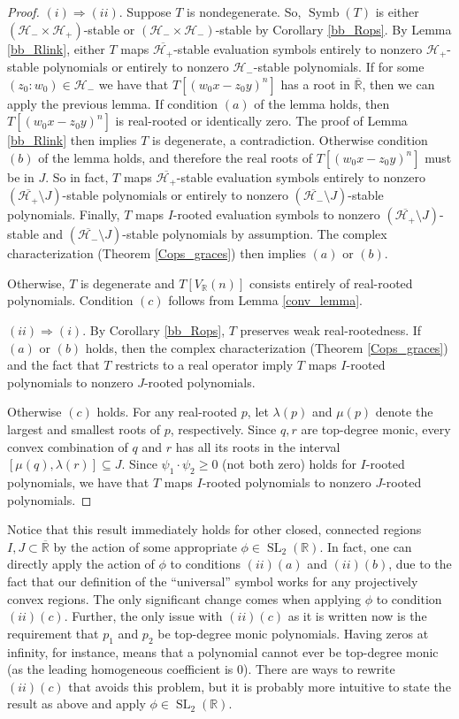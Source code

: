 \documentclass{article}
\theoremstyle{definition}
\theoremstyle{plain}
\newcommand{\R}{\mathbb{R}}
\newcommand{\UHP}{\mathcal{H}_+}
\newcommand{\LHP}{\mathcal{H}_-}
\DeclareMathOperator{\Symb}{Symb}
\DeclareMathOperator{\SL}{SL}
\begin{document}
\begin{proof}
    $(i) \Rightarrow (ii)$. Suppose $T$ is nondegenerate. So, $\Symb(T)$ is either $(\LHP \times \UHP)$-stable or $(\LHP \times \LHP)$-stable by Corollary \ref{bb_Rops}. By Lemma \ref{bb_Rlink}, either $T$ maps $\overline{\UHP}$-stable evaluation symbols entirely to nonzero $\UHP$-stable polynomials or entirely to nonzero $\LHP$-stable polynomials. If for some $(z_0:w_0) \in \LHP$ we have that $T[(w_0x-z_0y)^n]$ has a root in $\overline{\R}$, then we can apply the previous lemma. If condition $(a)$ of the lemma holds, then $T[(w_0x-z_0y)^n]$ is real-rooted or identically zero. The proof of Lemma \ref{bb_Rlink} then implies $T$ is degenerate, a contradiction. Otherwise condition $(b)$ of the lemma holds, and therefore the real roots of $T[(w_0x-z_0y)^n]$ must be in $J$. So in fact, $T$ maps $\overline{\UHP}$-stable evaluation symbols entirely to nonzero $(\overline{\UHP} \setminus J)$-stable polynomials or entirely to nonzero $(\overline{\LHP} \setminus J)$-stable polynomials. Finally, $T$ maps $I$-rooted evaluation symbols to nonzero $(\overline{\UHP} \setminus J)$-stable and $(\overline{\LHP} \setminus J)$-stable polynomials by assumption. The complex characterization (Theorem \ref{Cops_graces}) then implies $(a)$ or $(b)$.
    
    Otherwise, $T$ is degenerate and $T[V_\R(n)]$ consists entirely of real-rooted polynomials. Condition $(c)$ follows from Lemma \ref{conv_lemma}.
    
    $(ii) \Rightarrow (i)$. By Corollary \ref{bb_Rops}, $T$ preserves weak real-rootedness. If $(a)$ or $(b)$ holds, then the complex characterization (Theorem \ref{Cops_graces}) and the fact that $T$ restricts to a real operator imply $T$ maps $I$-rooted polynomials to nonzero $J$-rooted polynomials.
    
    Otherwise $(c)$ holds. For any real-rooted $p$, let $\lambda(p)$ and $\mu(p)$ denote the largest and smallest roots of $p$, respectively. Since $q,r$ are top-degree monic, every convex combination of $q$ and $r$ has all its roots in the interval $[\mu(q), \lambda(r)] \subseteq J$. Since $\psi_1 \cdot \psi_2 \geq 0$ (not both zero) holds for $I$-rooted polynomials, we have that $T$ maps $I$-rooted polynomials to nonzero $J$-rooted polynomials.
\end{proof}

Notice that this result immediately holds for other closed, connected regions $I,J \subset \overline{\R}$ by the action of some appropriate $\phi \in \SL_2(\R)$. In fact, one can directly apply the action of $\phi$ to conditions $(ii)(a)$ and $(ii)(b)$, due to the fact that our definition of the ``universal'' symbol works for any projectively convex regions. The only significant change comes when applying $\phi$ to condition $(ii)(c)$. Further, the only issue with $(ii)(c)$ as it is written now is the requirement that $p_1$ and $p_2$ be top-degree monic polynomials. Having zeros at infinity, for instance, means that a polynomial cannot ever be top-degree monic (as the leading homogeneous coefficient is 0). There are ways to rewrite $(ii)(c)$ that avoids this problem, but it is probably more intuitive to state the result as above and apply $\phi \in \SL_2(\R)$.
\end{document}
